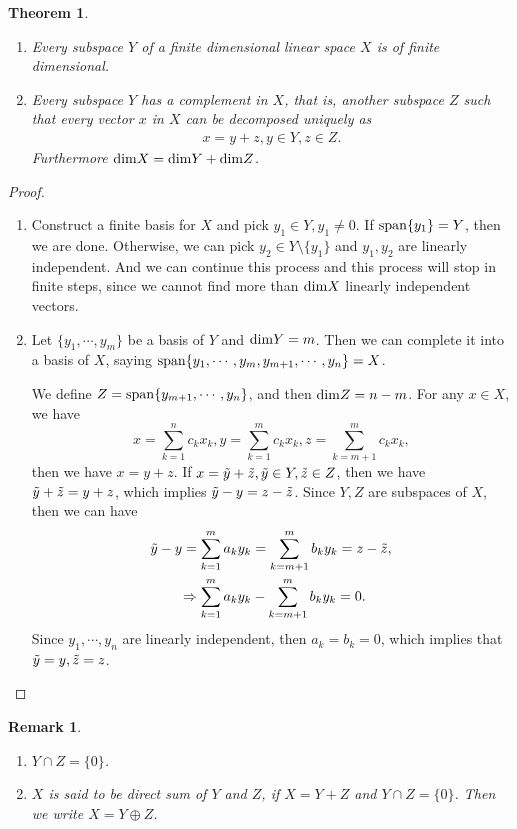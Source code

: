 \documentclass[11pt]{book}
\newtheorem{theorem}{Theorem}[chapter]
\newtheorem{remark}{Remark}[chapter]
\theoremstyle{definition}
\numberwithin{equation}{chapter}
\begin{document}
\medskip

\begin{theorem}
~\begin{enumerate}[label=(\alph*)]
    \item Every subspace $Y$ of a finite dimensional linear space $X$ is of finite dimensional.
    \item Every subspace $Y$ has a complement in $X$, that is, another subspace $Z$ such that every vector $x$ in $X$ can be decomposed uniquely as
    \begin{align*}
        x = y + z, y\in Y, z\in Z.
    \end{align*}
    Furthermore ${\rm dim}X = {\rm dim}Y + {\rm dim}Z$.
\end{enumerate}
\end{theorem}
\begin{proof}
~\begin{enumerate}[label=(\alph*)]
    \item Construct a finite basis for $X$ and pick $y_1\in Y, y_1\neq 0$. If ${\rm span}\{y_1\} = Y$, then we are done. Otherwise, we can pick $y_2\in Y\setminus\{y_1\}$ and $y_1, y_2$ are linearly independent. And we can continue this process and this process will stop in finite steps, since we cannot find more than ${\rm dim}X$ linearly independent vectors. 
    \item Let $\{y_1, \cdots, y_m\}$ be a basis of $Y$ and ${\rm dim}Y = m$. Then we can complete it into a basis of $X$, saying ${\rm span}\{y_1, \cdots, y_m, y_{m+1},\cdots, y_n\} = X$. 
    
    We define $Z = {\rm span}\{y_{m+1},\cdots, y_n\}$, and then ${\rm dim}Z = n - m$. For any $x\in X$, we have 
    $$x = \sum^n_{k=1}c_k x_k, y = \sum^m_{k=1}c_k x_k, z = \sum^m_{k=m+1}c_k x_k,$$ 
    then we have $x = y+z$. If $x = \Tilde{y} + \Tilde{z}, \Tilde{y}\in Y, \Tilde{z}\in Z$, then we have $\Tilde{y} + \Tilde{z} = y + z$, which implies $\Tilde{y} - y = z - \Tilde{z}$. Since $Y,Z$ are subspaces of $X$, then we can have 
    \begin{align*}
        \Tilde{y} - y = \sum^m_{k=1}a_ky_k & = \sum^m_{k=m+1}b_ky_k = z - \Tilde{z}, \\
        \Rightarrow \sum^m_{k=1}a_ky_k & - \sum^m_{k=m+1}b_ky_k = 0.
    \end{align*}
    Since $y_1,\cdots, y_n$ are linearly independent, then $a_k = b_k = 0$, which implies that $\Tilde{y}=y, \Tilde{z}=z$.
\end{enumerate}
\end{proof}
\begin{remark}
~\begin{enumerate}[label=(\arabic*)]
    \item $Y\cap Z = \{0\}$.
    \item $X$ is said to be direct sum of $Y$ and $Z$, if $X = Y+Z$ and $Y\cap Z = \{0\}$. Then we write $X = Y \oplus Z$.
\end{enumerate}
\end{remark}
\end{document}
